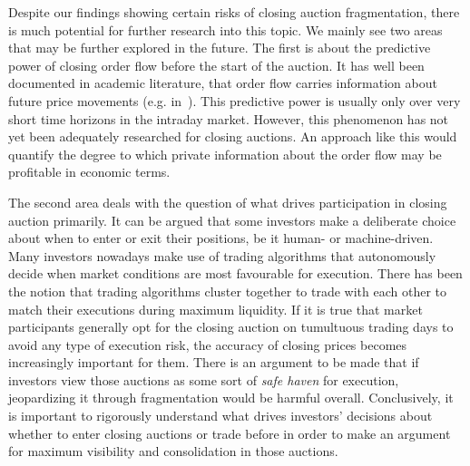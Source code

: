 \documentclass[11pt,a4paper, notitlepage]{article}
\begin{document}
	Despite our findings showing certain risks of closing auction fragmentation, there is much potential for further research into this topic. We mainly see two areas that may be further explored in the future. The first is about the predictive power of closing order flow before the start of the auction. It has well been documented in academic literature, that order flow carries information about future price movements (e.g. in~\textcite{ChordiaRollSubrahmanyam2005,ChordiaRollSubrahmanyam2008}). This predictive power is usually only over very short time horizons in the intraday market. However, this phenomenon has not yet been adequately researched for closing auctions. An approach like this would quantify the degree to which private information about the order flow may be profitable in economic terms.
	
	The second area deals with the question of what drives participation in closing auction primarily. It can be argued that some investors make a deliberate choice about when to enter or exit their positions, be it human- or machine-driven. Many investors nowadays make use of trading algorithms that autonomously decide when market conditions are most favourable for execution. There has been the notion that trading algorithms cluster together to trade with each other to match their executions during maximum liquidity. If it is true that market participants generally opt for the closing auction on tumultuous trading days to avoid any type of execution risk, the accuracy of closing prices becomes increasingly important for them. There is an argument to be made that if investors view those auctions as some sort of \emph{safe haven} for execution, jeopardizing it through fragmentation would be harmful overall. Conclusively, it is important to rigorously understand what drives investors' decisions about whether to enter closing auctions or trade before in order to make an argument for maximum visibility and consolidation in those auctions.
	
	
	\printbibliography[heading=bibintoc]
\end{document}
